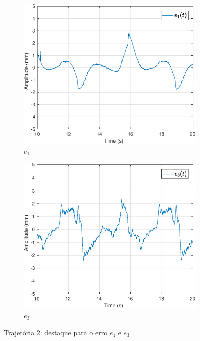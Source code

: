 \begin{figure}[H]
\centering
\begin{subfigure}{.5\textwidth}
  \centering
  \includegraphics[width=\linewidth]{./img/traj_2_k5/error0.eps}
  \caption{$e_1$}
  \label{fig:sub1}
\end{subfigure}%
\begin{subfigure}{.5\textwidth}
  \centering
  \includegraphics[width=\linewidth]{./img/traj_2_k5/error2.eps}
  \caption{$e_3$}
  \label{fig:sub2}
\end{subfigure}
\caption{Trajetória 2: destaque para o erro $e_1$ e $e_3$}
\label{fig:erro_traj}
\end{figure}



